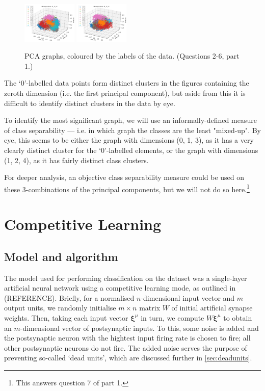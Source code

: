 \documentclass[a4paper, 11pt, twocolumn, draft]{article} %
\begin{document}
\begin{figure}
  \includegraphics[width=0.23\textwidth]{pca/134.png}
  \includegraphics[width=0.23\textwidth]{pca/234.png}
  \caption{PCA graphs, coloured by the labels of the data.
           (Questions 2-6, part 1.)}
  \label{fig:pca_graphs}
\end{figure}

The `0'-labelled data points form distinct clusters in the figures containing
the zeroth dimension (i.e. the first principal component), but aside from this
it is difficult to identify distinct clusters in the data by eye.

To identify the most significant graph, we will use an informally-defined
measure of class separability --- i.e. in which graph the classes are the least
"mixed-up".  By eye, this seems to be either the graph with dimensions (0, 1,
3), as it has a very clearly distinct cluster for the `0'-labelled elements, or
the graph with dimensions (1, 2, 4), as it has fairly distinct class clusters.

For deeper analysis, an objective class separability measure could be used on
these 3-combinations of the principal components, but we will not do so
here.\footnote{This answers question 7 of part 1.}

\section{Competitive Learning} \subsection{Model and algorithm} The model used
for performing classification on the dataset was a single-layer artificial
neural network using a competitive learning mode, as outlined in (REFERENCE).
Briefly, for a normalised $n$-dimensional input vector and $m$ output units, we
randomly initialise $m{\times}n$ matrix $W$ of initial artificial synapse
weights.  Then, taking each input vector $\bm{\xi}^\mu$ in turn, we compute
$W\bm{\xi}^\mu$ to obtain an $m$-dimensional vector of postsynaptic inputs.  To
this, some noise is added and the postsynaptic neuron with the hightest input
firing rate is chosen to fire; all other postsynaptic neurons do not fire.  The
added noise serves the purpose of preventing so-called `dead units', which are
discussed further in \autoref{sec:deadunits}.
\end{document}
